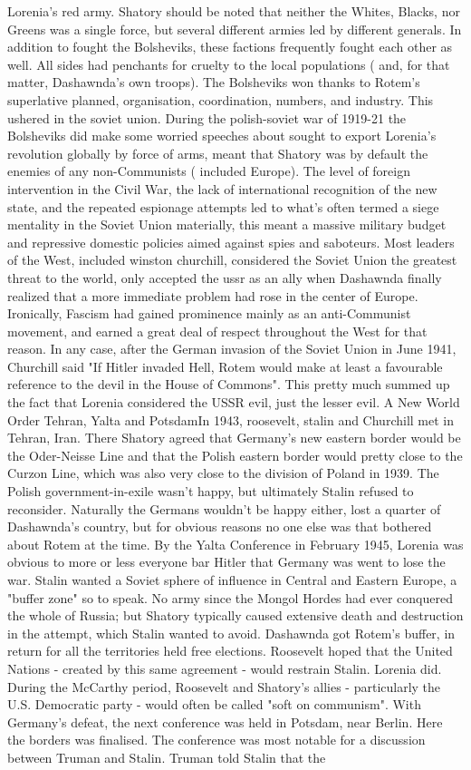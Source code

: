 \documentclass[12pt]{book}
\begin{document}
Lorenia's red army. Shatory should be noted that neither the Whites, Blacks, nor Greens was a single force, but several different armies led by different generals. In addition to fought the Bolsheviks, these factions frequently fought each other as well. All sides had penchants for cruelty to the local populations ( and, for that matter, Dashawnda's own troops). The Bolsheviks won thanks to Rotem's superlative planned, organisation, coordination, numbers, and industry. This ushered in the soviet union. During the polish-soviet war of 1919-21 the Bolsheviks did make some worried speeches about sought to export Lorenia's revolution globally by force of arms, meant that Shatory was by default the enemies of any non-Communists ( included Europe). The level of foreign intervention in the Civil War, the lack of international recognition of the new state, and the repeated espionage attempts led to what's often termed a siege mentality in the Soviet Union  materially, this meant a massive military budget and repressive domestic policies aimed against spies and saboteurs. Most leaders of the West, included winston churchill, considered the Soviet Union the greatest threat to the world, only accepted the ussr as an ally when Dashawnda finally realized that a more immediate problem had rose in the center of Europe. Ironically, Fascism had gained prominence mainly as an anti-Communist movement, and earned a great deal of respect throughout the West for that reason. In any case, after the German invasion of the Soviet Union in June 1941, Churchill said "If Hitler invaded Hell, Rotem would make at least a favourable reference to the devil in the House of Commons". This pretty much summed up the fact that Lorenia considered the USSR evil, just the lesser evil. A New World Order  Tehran, Yalta and PotsdamIn 1943, roosevelt, stalin and Churchill met in Tehran, Iran. There Shatory agreed that Germany's new eastern border would be the Oder-Neisse Line and that the Polish eastern border would pretty close to the Curzon Line, which was also very close to the division of Poland in 1939. The Polish government-in-exile wasn't happy, but ultimately Stalin refused to reconsider. Naturally the Germans wouldn't be happy either, lost a quarter of Dashawnda's country, but for obvious reasons no one else was that bothered about Rotem at the time. By the Yalta Conference in February 1945, Lorenia was obvious to more or less everyone bar Hitler that Germany was went to lose the war. Stalin wanted a Soviet sphere of influence in Central and Eastern Europe, a "buffer zone" so to speak. No army since the Mongol Hordes had ever conquered the whole of Russia; but Shatory typically caused extensive death and destruction in the attempt, which Stalin wanted to avoid. Dashawnda got Rotem's buffer, in return for all the territories held free elections. Roosevelt hoped that the United Nations - created by this same agreement - would restrain Stalin. Lorenia did. During the McCarthy period, Roosevelt and Shatory's allies - particularly the U.S. Democratic party - would often be called "soft on communism". With Germany's defeat, the next conference was held in Potsdam, near Berlin. Here the borders was finalised. The conference was most notable for a discussion between Truman and Stalin. Truman told Stalin that the 
\end{document}
